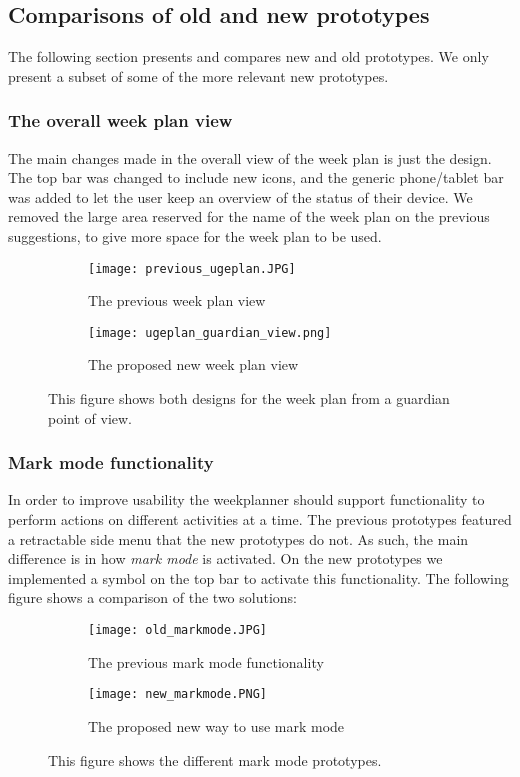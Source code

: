 \subsection{Comparisons of old and new prototypes}
The following section presents and compares new and old prototypes. 
We only present a subset of some of the more relevant new prototypes.
\subsubsection{The overall week plan view}
The main changes made in the overall view of the week plan is just the design. 
The top bar was changed to include new icons, and the generic phone/tablet bar was added to let the user keep an overview of the status of their device.
We removed the large area reserved for the name of the week plan on the previous suggestions, to give more space for the week plan to be used. 
\begin{figure}[H]
    \begin{subfigure}{0.5\textwidth}
    \texttt{[image: previous\_ugeplan.JPG]} 
    \caption{The previous week plan view}
    \label{fig:previous_weekplan_view}
    \end{subfigure}
    \begin{subfigure}{0.5\textwidth}
        \texttt{[image: ugeplan\_guardian\_view.png]}
    \caption{The proposed new week plan view}
    \label{fig:new_weekplan_view}
    \end{subfigure} 
    \caption{This figure shows both designs for the week plan from a guardian point of view.}
    \label{fig:weekplan_view}
\end{figure}

\subsubsection{Mark mode functionality}
In order to improve usability the weekplanner should support functionality to perform actions on different activities at a time.
The previous prototypes featured a retractable side menu that the new prototypes do not.
As such, the main difference is in how \textit{mark mode} is activated. 
On the new prototypes we implemented a symbol on the top bar to activate this functionality.
The following figure shows a comparison of the two solutions:

\begin{figure}[H]
    \begin{subfigure}{0.5\textwidth}
    \texttt{[image: old\_markmode.JPG]} 
    \caption{The previous mark mode functionality}
    \label{fig:old_markmode}
    \end{subfigure}
    \begin{subfigure}{0.5\textwidth}
        \texttt{[image: new\_markmode.PNG]}
    \caption{The proposed new way to use mark mode}
    \label{fig:new_markmode}
    \end{subfigure} 
    \caption{This figure shows the different mark mode prototypes.}
    \label{fig:markmode_prototypes}
\end{figure}

